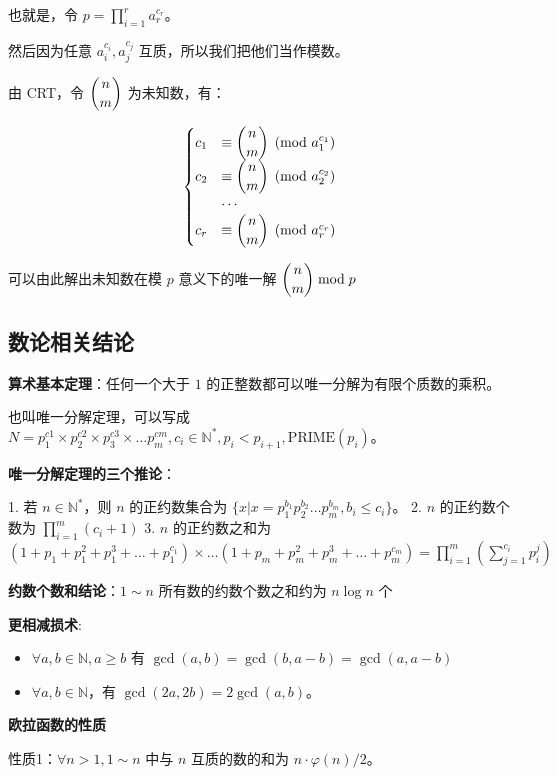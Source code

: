 \documentclass[titlepage, a4paper]{article}
\begin{document}
\begin{multicols}{2}
\begin{spacing}{0.6}
			 		也就是，令 $p = \prod\limits_{i = 1}^ra_{r}^{c_r}$。
			 		
			 		然后因为任意 $a_{i}^{c_i}, a_{j}^{c_j}$ 互质，所以我们把他们当作模数。
			 		
			 		由 CRT，令 $\dbinom{n}{m}$ 为未知数，有：
			 		
			 		$$
			 		\begin{cases}
			 			c_1 &\equiv \dbinom{n}{m} \pmod {a_{1}^{c_1}} \\
			 			c_2 &\equiv \dbinom{n}{m} \pmod {a_{2}^{c_2}} \\
			 			&\cdots\\
			 			c_r &\equiv \dbinom{n}{m} \pmod {a_{r}^{c_r}}
			 		\end{cases}
			 		$$
			 		
			 		可以由此解出未知数在模 $p$ 意义下的唯一解 $\dbinom{n}{m} \bmod p$
			 	\subsection{数论相关结论}
			 		\textbf{算术基本定理}：任何一个大于 $1$ 的正整数都可以唯一分解为有限个质数的乘积。
			 	
			 		也叫唯一分解定理，可以写成 $N = p_1^{c1}\times p_2^{c2}\times p_3^{c3}\times \dots p_m^{cm}, c_i \in \mathbb{N}^*, p_i < p_{i + 1},\text{PRIME}(p_i)$。
			 	
			 		\textbf{唯一分解定理的三个推论}：
			 		
			 		1. 若 $n \in \mathbb{N}^*$，则 $n$ 的正约数集合为 $\{x | x = p_1^{b_1}p_2^{b_2}\dots p_m^{b_m},b_i \le 	c_i\}$。
			 		2. $n$ 的正约数个数为 $\prod\limits_{i = 1}^m(c_i+ 1)$
			 		3. $n$ 的正约数之和为 $(1+p_1+p_1^2+p_1^3+\dots +p_1^{c_1})\times\dots(1+p_m+p_m^2+p_m^3+\dots +p_m^{c_m}) = \prod\limits_{i = 1}^m(\sum\limits_{j = 1}^{c_i} p_i^{j})$
			 	
				 	\textbf{约数个数和结论}：$1\sim n$ 所有数的约数个数之和约为 $n\log n$ 个
				 	
				 	\textbf{更相减损术}:
				 	\begin{itemize}
				 		\item $\forall a,b \in \mathbb{N},a\ge b$ 有 $\gcd(a,b) = \gcd(b, a-b) = \gcd(a, a-b)$
				 		\item $\forall a,b \in \mathbb{N}$，有 $\gcd(2a,2b) = 2\gcd(a,b)$。
				 	\end{itemize}
			 	
				 	\textbf{欧拉函数的性质}
				 	
				 	性质1：$\forall n > 1, 1\sim n$ 中与 $n$ 互质的数的和为 $n\cdot\varphi(n)/2$。
				 	

\end{spacing}
\end{multicols}
\end{document}

